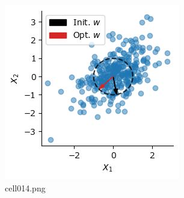 \begin{figure}[ht]
	\centering
	\includegraphics[scale=0.8, max width=\linewidth]{./fig/local-learning-rule/pca-hebbian-learning/cell014.png}
	\caption{cell014.png}
	\label{cell014.png}
\end{figure}